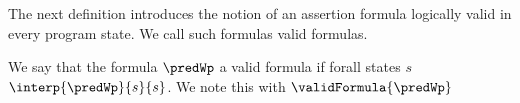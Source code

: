  

The next definition introduces the notion of an assertion formula logically valid 
in every program state. We call such formulas  valid formulas. 

\begin{interpretation}\label{assertLang:interpretation:valid}
  We say that the formula  $ \predWp $ a valid formula if forall states $s$  $\interp{\predWp}{s}{s}$. 
We note this with  $\validFormula{\predWp}$ 
\end{interpretation}
